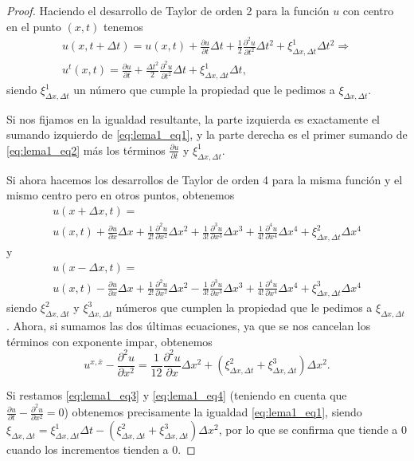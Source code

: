 \begin{proof}
	Haciendo el desarrollo de Taylor de orden 2 para la función $u$ con centro en el punto $(x,t)$ tenemos
	\begin{multline}
		u(x,t+\Delta t)=u(x,t) + \frac{\partial u}{\partial t}\Delta t + \frac{1}{2}\frac{\partial^2u}{\partial t^2}\Delta t^2 + \xi^1_{\Delta x, \Delta t}\Delta t^2 \Rightarrow \\
		u^t(x,t) = \frac{\partial u}{\partial t} + \frac{\Delta t^2}{2}\frac{\partial^2u}{\partial t^2}\Delta t + \xi_{\Delta x, \Delta t}^1\Delta t,
	\end{multline}
	siendo $\xi^1_{\Delta x,\Delta t}$ un número que cumple la propiedad que le pedimos a $\xi_{\Delta x,\Delta t}$.
	
	Si nos fijamos en la igualdad resultante, la parte izquierda es exactamente el sumando izquierdo de \eqref{eq:lema1_eq1}, y la parte derecha es el primer sumando de \eqref{eq:lema1_eq2} más los términos $\frac{\partial u}{\partial t}$ y $\xi^1_{\Delta x, \Delta t}$.
	
	Si ahora hacemos los desarrollos de Taylor de orden 4 para la misma función y el mismo centro pero en otros puntos, obtenemos
	\begin{multline}\label{eq:lema1_eq3}
		u(x+\Delta x,t)= \\ u(x,t)+\frac{\partial u}{\partial x}\Delta x+\frac{1}{2!}\frac{\partial^2 u}{\partial x^2}\Delta x^2 + \frac{1}{3!}\frac{\partial^3u}{\partial x^3}\Delta x^3+\frac{1}{4!}\frac{\partial^4u}{\partial x^4}\Delta x^4 + \xi_{\Delta x, \Delta t}^2\Delta x^4
	\end{multline}
	y
	\begin{multline}
		u(x-\Delta x,t)= \\ u(x,t)-\frac{\partial u}{\partial x}\Delta x+\frac{1}{2!}\frac{\partial^2 u}{\partial x^2}\Delta x^2 - \frac{1}{3!}\frac{\partial^3u}{\partial x^3}\Delta x^3+\frac{1}{4!}\frac{\partial^4u}{\partial x^4}\Delta x^4 + \xi_{\Delta x, \Delta t}^3\Delta x^4
	\end{multline}
	siendo $\xi_{\Delta x, \Delta t}^2$ y $\xi_{\Delta x, \Delta t}^3$ números que cumplen la propiedad que le pedimos a $\xi_{\Delta x, \Delta t}$.
	Ahora, si sumamos las dos últimas ecuaciones, ya que se nos cancelan los términos con exponente impar, obtenemos
	\begin{equation}\label{eq:lema1_eq4}
		u^{x,\bar{x}} - \frac{\partial^2u}{\partial x^2}=\frac{1}{12}\frac{\partial^2u}{\partial x}\Delta x^2 + (\xi_{\Delta x, \Delta t}^2+\xi_{\Delta x, \Delta t}^3)\Delta x^2.
	\end{equation}

	Si restamos \eqref{eq:lema1_eq3} y \eqref{eq:lema1_eq4} (teniendo en cuenta que $\frac{\partial u}{\partial t} - \frac{\partial^2u}{\partial x^2}=0$) obtenemos precisamente la igualdad \eqref{eq:lema1_eq1}, siendo $\xi_{\Delta x, \Delta t} = \xi_{\Delta x, \Delta t}^1\Delta t - (\xi_{\Delta x, \Delta t}^2+\xi_{\Delta x, \Delta t}^3)\Delta x^2$, por lo que se confirma que tiende a 0 cuando los incrementos tienden a 0.
\end{proof}

